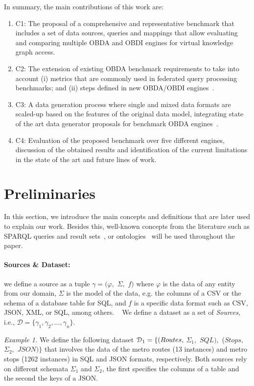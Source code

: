 In summary, the main contributions of this work are:
\begin{enumerate}
    \item C1: The proposal of a comprehensive and representative benchmark that includes a set of data sources, queries and mappings that allow evaluating and comparing multiple %
    OBDA and OBDI engines for virtual knowledge graph access.
    \item C2: The extension of existing OBDA benchmark requirements to take into account (i) metrics that are commonly used in federated query processing benchmarks; and (ii) steps defined in new OBDA/OBDI engines~\citep{corcho2019towards}.
    \item C3: A data generation process where single and mixed data formats are scaled-up based on the features of the  original data model, integrating state of the art data generator proposals for benchmark OBDA engines~\citep{lantivig}.
    \item C4: Evaluation of the proposed benchmark over five different engines, discussion of the obtained results and identification of the current limitations in the state of the art and future lines of work. 
\end{enumerate}


\section{Preliminaries}

In this section, we introduce the main concepts and definitions that are later used to explain our work. Besides this, well-known concepts from the literature such as SPARQL queries and result sets~\citep{w3c2013sparql}, or ontologies~\citep{mcguinness2004owl} will be used throughout the paper.

\paragraph{\textbf{Sources \& Dataset:}} we define a source as a tuple $\gamma=(\varphi,$ $\Sigma ,$ $f)$ where $\varphi$ is the data of any entity from our domain, $\Sigma$ is the model of the data, e.g. the columns of a CSV or the schema of a database table for SQL, and $f$ is a specific data format such as CSV, JSON, XML, or SQL, among others.%
~ We define a dataset as a set of \textit{Sources}, i.e., $\mathcal{D}=\{\gamma_1,\gamma_2, ..., \gamma_n\}$. 

\textit{Example 1.} We define the following dataset $\mathcal{D}_{1}=\{(Rou\-tes,$ $\Sigma_1,$ $SQL),$ ($Stops,$ $\Sigma_2,$ $JSON)\}$ that involves the data of the metro routes (13 instances) and metro stops (1262 instances) in SQL and JSON formats, respectively. Both sources rely on different schemata $\Sigma_1$ and $\Sigma_2$, the first specifies the columns of a table and the second the keys of a JSON.

